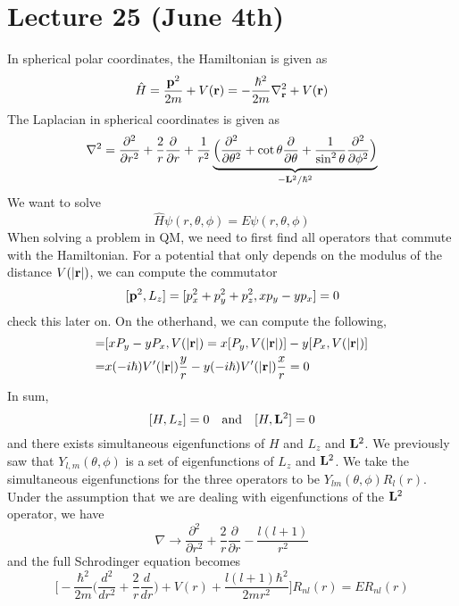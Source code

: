 \section{Lecture 25 (June 4th)}
\begin{thm}
In spherical polar coordinates, the Hamiltonian is given as
\[\hat{H}=\dfrac{{\bf p}^2}{2m}+V({\bf r})=-\dfrac{\hbar ^2}{2m}\nabla ^2_{{\bf r}}+V({\bf r})\]
The Laplacian in spherical coordinates is given as
\[\nabla ^2=\dfrac{\partial ^2}{\partial r^2}+\dfrac{2}{r}\dfrac{\partial }{\partial r}+\dfrac{1}{r^2}\underbrace{\Big(\dfrac{\partial ^2}{\partial \theta ^2}+\cot\theta \dfrac{\partial }{\partial \theta } +\dfrac{1}{\sin^2\theta  }\dfrac{\partial ^2}{\partial \phi ^2}  \Big)}_{-{\bf L}^2/\hbar ^2} \]
We want to solve
\[\hat{H}\psi (r,\theta ,\phi )=E\psi (r,\theta ,\phi )\]
When solving a problem in QM, we need to first find all operators that commute with the Hamiltonian. For a potential that only depends on the modulus of the distance $V(|{\bf r}|)$, we can compute the commutator
\[[{\bf p}^2,L_{z}]=[p_{x}^2+p_{y}^2+p_{z}^2,xp_{y}-yp_{x}]=0\]
check this later on. On the otherhand, we can compute the following,
\begin{align*}
[L_{z},V(|{\bf r}|)]=&[xP_{y}-yP_{x},V(|{\bf r}|)=x[P_{y},V(|{\bf r}|)]-y[P_{x},V(|{\bf r}|)]\\=&x(-i\hbar )V'(|{\bf r}|)\dfrac{y}{r}-y(-i\hbar )V'(|{\bf r}|)\dfrac{x}{r}=0
\end{align*}
In sum,
\[[H,L_{z}]=0\quad \mathrm{and}\quad [H,{\bf L}^2]=0\]
and there exists simultaneous eigenfunctions of $H$ and $L_{z}$ and ${\bf L}^2$. We previously saw that $Y_{l,m}(\theta ,\phi )$ is a set of eigenfunctions of $L_{z}$ and ${\bf L}^2$. We take the simultaneous eigenfunctions for the three operators to be $Y_{lm}(\theta ,\phi )R_{l}(r)$. Under the assumption that we are dealing with eigenfunctions of the ${\bf L}^2$ operator, we have
\[\nabla\rightarrow \dfrac{\partial ^2}{\partial r^2}+\dfrac{2}{r}\dfrac{\partial }{\partial r}-\dfrac{l(l+1)}{r^2}  \]
and the full Schrodinger equation becomes
\[\Bigg[-\dfrac{\hbar ^2}{2m}\Big(\dfrac{d ^2}{d r^2}+\dfrac{2}{r}\dfrac{d }{d r} \Big)+V(r)+\dfrac{l(l+1)\hbar ^2}{2mr^2}\Bigg]R_{nl}(r)=ER_{nl}(r)\]
\end{thm}
\vspace{2ex}

